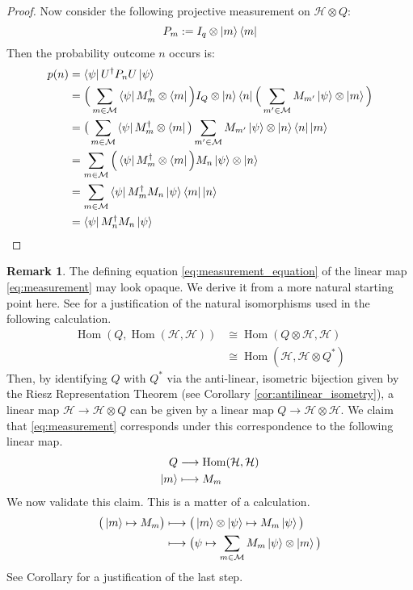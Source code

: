 \documentclass[12pt]{article}
\theoremstyle{plain}
\theoremstyle{definition}
\newtheorem{remark}[thm]{Remark}
\newcommand{\call}[1]{\mathcal{#1}}
\newcommand{\lto}{\longrightarrow}
\begin{document}
\begin{proof}
		Now consider the following projective measurement on $\call{H} \otimes Q$:
		\begin{equation}
			P_m := I_q \otimes \ket{m}\bra{m}
		\end{equation}
		Then the probability outcome $n$ occurs is:
		\begin{align*}
			p(n) &= \bra{\psi}U^\dagger P_n U \ket{\psi}\\
			&= \Big(\sum_{m \in \call{M}}\bra{\psi}M_m^\dagger \otimes \bra{m}\Big) I_Q \otimes \ket{n}\bra{n}\Big(\sum_{m' \in \call{M}}M_{m'}\ket{\psi}\otimes\ket{m}\Big)\\
			&= \big(\sum_{m \in \call{M}}\bra{\psi}M_m^\dagger \otimes \bra{m}\big)\sum_{m'\in\call{M}}M_{m'}\ket{\psi}\otimes\ket{n}\bra{n}\ket{m}\\
			&=\sum_{m \in \call{M}}\Big(\bra{\psi}M_m^\dagger \otimes \bra{m}\Big) M_n \ket{\psi}\otimes \ket{n}\\
			&=\sum_{m \in \call{M}}\bra{\psi}M_m^\dagger M_n\ket{\psi}\bra{m}\ket{n}\\
			&=\bra{\psi}M_n^\dagger M_n \ket{\psi}
		\end{align*}
	\end{proof}
	\begin{remark}
		The defining equation \eqref{eq:measurement_equation} of the linear map \eqref{eq:measurement} may look opaque. We derive it from a more natural starting point here. See \cite[\S Partial Trace]{CommutativeAlgebra} for a justification of the natural isomorphisms used in the following calculation.
		\begin{align}
			\operatorname{Hom}(Q, \operatorname{Hom}(\call{H}, \call{H})) &\cong \operatorname{Hom}(Q \otimes \call{H}, \call{H})\\
			&\cong\operatorname{Hom}(\call{H}, \call{H} \otimes Q^\ast)
		\end{align}
		Then, by identifying $Q$ with $Q^\ast$ via the anti-linear, isometric bijection given by the Riesz Representation Theorem (see Corollary \ref{cor:antilinear_isometry}), a linear map $\call{H} \lto \call{H} \otimes Q$ can be given by a linear map $Q \lto \call{H} \otimes \call{H}$. We claim that \eqref{eq:measurement} corresponds under this correspondence to the following linear map.
		\begin{align}
			Q &\lto \operatorname{Hom}(\call{H}, \call{H})\\
			\ket{m} &\longmapsto M_m
		\end{align}
		We now validate this claim. This is a matter of a calculation.
		\begin{align}
			\big(\ket{m} \mapsto M_m\big) &\longmapsto \big(\ket{m} \otimes \ket{\psi} \mapsto M_m\ket{\psi}\big)\\
			& \longmapsto \big(\psi \mapsto \sum_{m \in \call{M}} M_m\ket{\psi} \otimes \ket{m}\big)
		\end{align}
		See Corollary \cite[1.2.6]{CommutativeAlgebra} for a justification of the last step.
	\end{remark}
	
\end{document}
